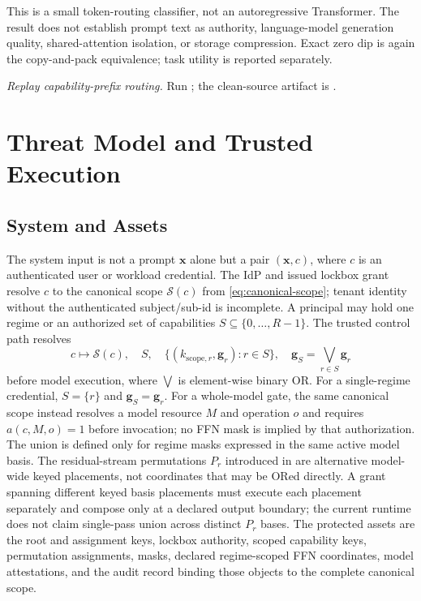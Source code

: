 \documentclass[11pt,a4paper]{article}
\newcommand{\bx}{\mathbf{x}}
\newcommand{\bg}{\mathbf{g}}
\begin{document}
This is a small token-routing classifier, not an autoregressive Transformer.
The result does not establish prompt text as authority, language-model
generation quality, shared-attention isolation, or storage compression. Exact
zero dip is again the copy-and-pack equivalence; task utility is reported
separately.

\begin{sloppypar}
\noindent\textit{Replay capability-prefix routing.} Run
; the clean-source artifact is
.
\end{sloppypar}

\section{Threat Model and Trusted Execution}
\label{sec:threat-model}

\subsection{System and Assets}

The system input is not a prompt $\bx$ alone but a pair $(\bx,c)$,
where $c$ is an authenticated user or workload credential.  The IdP
and issued lockbox grant resolve $c$ to the canonical scope $\mathcal S(c)$
from \eqref{eq:canonical-scope}; tenant identity without the
authenticated subject/sub-id is incomplete.  A
principal may hold one regime or an authorized set of capabilities
$S\subseteq\{0,\ldots,R-1\}$.  The trusted control path resolves
\begin{equation}
c \longmapsto
\mathcal S(c),\quad S,\quad \{(k_{\mathrm{scope},r},\bg_r):r\in S\},
\quad \bg_S=\bigvee_{r\in S}\bg_r
\label{eq:credential-resolution}
\end{equation}
before model execution, where $\bigvee$ is element-wise binary OR.
For a single-regime credential, $S=\{r\}$ and $\bg_S=\bg_r$.
For a whole-model gate, the same canonical scope instead resolves a
model resource $M$ and operation $o$ and requires $a(c,M,o)=1$ before
invocation; no FFN mask is implied by that authorization.
The union is defined only for regime masks expressed in the same
active model basis.  The residual-stream permutations $P_r$
introduced in  are alternative
model-wide keyed placements,
not coordinates that may be ORed directly.  A grant spanning
different keyed basis placements must execute each placement
separately and compose only at a declared output boundary; the current
runtime does not claim single-pass union across distinct $P_r$ bases.
The protected assets are the root and assignment keys, lockbox
authority, scoped capability keys, permutation assignments, masks,
declared regime-scoped FFN coordinates, model attestations, and the
audit record binding those objects to the complete canonical scope.
\end{document}
